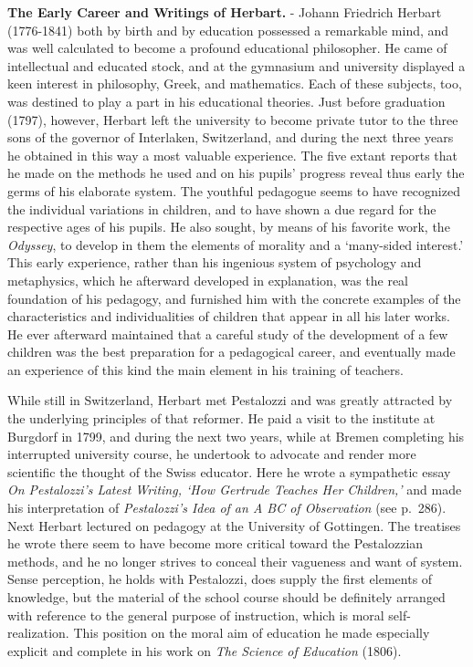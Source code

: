 \documentclass[
]{book}
\begin{document}
\textbf{The Early Career and Writings of Herbart.} - Johann Friedrich Herbart (1776-1841) both by birth and by education possessed a remarkable mind, and was well calculated to become a profound educational philosopher. He came of intellectual and educated stock, and at the gymnasium and university displayed a keen interest in philosophy, Greek, and mathematics. Each of these subjects, too, was destined to play a part in his educational theories. Just before graduation (1797), however, Herbart left the university to become private tutor to the three sons of the governor of Interlaken, Switzerland, and during the next three years he obtained in this way a most valuable experience. The five extant reports that he made on the methods he used and on his pupils' progress reveal thus early the germs of his elaborate system. The youthful pedagogue seems to have recognized the individual variations in children, and to have shown a due regard for the respective ages of his pupils. He also sought, by means of his favorite work, the \emph{Odyssey}, to develop in them the elements of morality and a `many-sided interest.' This early experience, rather than his ingenious system of psychology and metaphysics, which he afterward developed in explanation, was the real foundation of his pedagogy, and furnished him with the concrete examples of the characteristics and individualities of children that appear in all his later works. He ever afterward maintained that a careful study of the development of a few children was the best preparation for a pedagogical career, and eventually made an experience of this kind the main element in his training of teachers.

While still in Switzerland, Herbart met Pestalozzi and was greatly attracted by the underlying principles of that reformer. He paid a visit to the institute at Burgdorf in 1799, and during the next two years, while at Bremen completing his interrupted university course, he undertook to advocate and render more scientific the thought of the Swiss educator. Here he wrote a sympathetic essay \emph{On Pestalozzi's Latest Writing, `How Gertrude Teaches Her Children,'} and made his interpretation of \emph{Pestalozzi's Idea of an A BC of Observation} (see p.~286). Next Herbart lectured on pedagogy at the University of Gottingen. The treatises he wrote there seem to have become more critical toward the Pestalozzian methods, and he no longer strives to conceal their vagueness and want of system. Sense perception, he holds with Pestalozzi, does supply the first elements of knowledge, but the material of the school course should be definitely arranged with reference to the general purpose of instruction, which is moral self-realization. This position on the moral aim of education he made especially explicit and complete in his work on \emph{The Science of Education} (1806).
\end{document}
